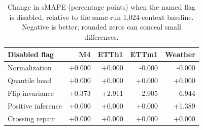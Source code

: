 \begin{table}[!htbp]
\centering
\caption{Change in sMAPE (percentage points) when the named flag is disabled, relative to the same-run 1,024-context baseline. Negative is better; rounded zeros can conceal small differences.}
\label{tab:flagssmape}
\small
\setlength{\tabcolsep}{3.5pt}
\begin{tabular}{lrrrr}
\hline
Disabled flag & M4 & ETTh1 & ETTm1 & Weather \\
\hline
Normalization & +0.000 & +0.000 & -0.000 & -0.000 \\
Quantile head & +0.000 & +0.000 & +0.000 & +0.000 \\
Flip invariance & +0.373 & +2.911 & -2.905 & -6.944 \\
Positive inference & +0.000 & +0.000 & +0.000 & +1.389 \\
Crossing repair & +0.000 & +0.000 & +0.000 & +0.000 \\
\hline
\end{tabular}
\end{table}

